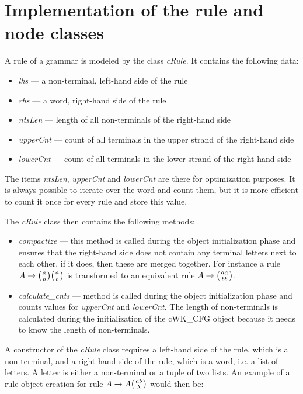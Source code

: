 \section{Implementation of the rule and node classes} \label{section:cRule_cNode}
A rule of a grammar is modeled by the class \textit{cRule}. It contains the following data:
\begin{itemize}
  \item{\textit{lhs} --- a non-terminal, left-hand side of the rule}
  \item{\textit{rhs} --- a word, right-hand side of the rule}
  \item{\textit{ntsLen} --- length of all non-terminals of the right-hand side}
  \item{\textit{upperCnt} --- count of all terminals in the upper strand of the right-hand side}
  \item{\textit{lowerCnt} --- count of all terminals in the lower strand of the right-hand side}
\end{itemize}

The items \textit{ntsLen}, \textit{upperCnt} and \textit{lowerCnt} are there for optimization purposes. It is always possible to iterate over the word and count them, but it is more efficient to count it once for every rule and store this value.

The \textit{cRule} class then contains the following methods:
\begin{itemize}
  \item{\textit{compactize} --- this method is called during the object initialization phase and ensures that the right-hand side does not contain any terminal letters next to each other, if it does, then these are merged together. For instance a rule $A \rightarrow \wkpair{a}{b} \wkpair{a}{b}$ is transformed to an equivalent rule $A \rightarrow \wkpair{aa}{bb}$.}
  \item{\textit{calculate\_cnts} --- method is called during the object initialization phase and counts values for \textit{upperCnt} and \textit{lowerCnt}}. The length of non-terminals is calculated during the initialization of the cWK\_CFG object because it needs to know the length of non-terminals.
\end{itemize}

A constructor of the \textit{cRule} class requires a left-hand side of the rule, which is a non-terminal, and a right-hand side of the rule, which is a word, i.e. a list of letters. A letter is either a non-terminal or a tuple of two lists. An example of a rule object creation for rule $A \rightarrow A \wkpair{ab}{\lambda}$ would then be:

